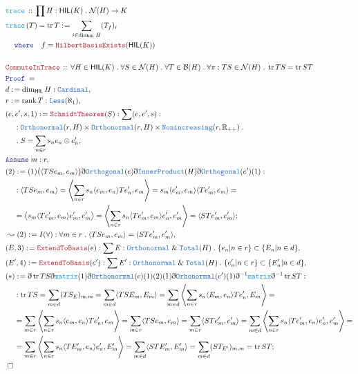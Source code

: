 \documentclass[12pt]{scrartcl}
\newcommand{\TYPE}[1]{\textcolor{NavyBlue}{\mathtt{#1}}}
\newcommand{\FUNC}[1]{\textcolor{Cerulean}{\mathtt{#1}}}
\newcommand{\LOGIC}[1]{\textcolor{Blue}{\mathtt{#1}}}
\newcommand{\THM}[1]{\textcolor{Maroon}{\mathtt{#1}}}
\renewcommand{\.}{\; . \;}
\newcommand{\de}{: \kern 0.1pc =}
\newcommand{\Act}[1]{\left( #1 \right)}
\newcommand{\Theorem}[2]{& \THM{#1} \, :: \, #2 \\ & \Proof = \\ }
\newcommand{\DeclareFunc}[2]{& \FUNC{#1} \, :: \, #2 \\}
\newcommand{\DefineNamedFunc}[4]{&  \FUNC{#1}\Act{#2} = #3 \de #4 \\}
\newcommand{\NewLine}{\\ & \kern 1pc}
\newcommand{\Page}[1]{\begin{align*} #1 \end{align*} \newpage   }
\newcommand{ \bd }{ \ByDef }
\renewcommand{\And}{\; \& \;}
\newcommand{\Reals}{\mathbb{R} }
\newcommand{\Say}[3]{& #1 \de #2 : #3, \\}
\newcommand{\Conclude}[3]{& #1 \de #2 : #3; \\}
\newcommand{\Derive}[3]{& \leadsto #1 \de #2 : #3, \\}
\newcommand{\A}{\LOGIC{Assume} \;}
\newcommand{\Assume}[2]{& \A #1 : #2, \\}
\newcommand{\QED}{\; \square}
\newcommand{\EndProof}{& \QED \\}
\newcommand{\ByDef}{\eth}
\newcommand{\Proof}{\LOGIC{Proof} \; }
\DeclareMathOperator*{\rank}{rank}
\DeclareMathOperator{\tr}{tr}
\newcommand{\HIL}{\mathsf{HIL}} %
\newcommand{\N}{\mathcal{N}}
\newcommand{\B}{\mathcal{B}}
\begin{document}
\Page{
	\DeclareFunc{trace}{  \prod H : \HIL(K) \. \N(H) \to K}
	\DefineNamedFunc{trace}{ T  }{\tr T}{  \sum_{i \in \dim_\HIL H} (T_f)_i
	\NewLine \LOGIC{where} \quad f = \THM{HilbertBasisExists}(\HIL(K))
	} 
	\\
	\Theorem{CommuteInTrace}{ 
	\forall H \in \HIL(K) \. 
	\forall S \in \N(H) \. 
	\forall  T \in \B(H) \.
	\forall \pi : TS \in \N(H) \. \tr TS = \tr ST }
	\Say{d}{\dim_\HIL H}{ \TYPE{Cardinal}}
	\Say{r }{\rank T}{ \TYPE{Less}(\aleph_1 )}
	\Say{(e,e',s,1)}{\THM{SchmidtTheorem}(S)}{ \sum (e,e',s) : 
		\NewLine :
		\TYPE{Orthonormal}(r,H) \times \TYPE{Orthonormal}(r,H)
		\times \TYPE{Nonincreasing}(r,\Reals_{++}) \.
		\NewLine \. S  = \sum_{n \in r} s_n e_n \otimes e'_n 
	}
	\Assume{m}{r}
	\Conclude{(2)}{ (1)\big( \langle TSe_m, e_m \rangle \big) \bd \TYPE{Orthogonal}(e)
		\bd \TYPE{InnerProduct}(H) \bd \TYPE{Orthogonal}(e')(1) 
	}
	{
		\NewLine :
		\langle TSe_m,   e_m \rangle =
		\left\langle \sum_{n \in r} s_n \langle e_ m, e_n \rangle Te'_n, e_m \right\rangle =
		s_m \langle e'_m, e_m \rangle \langle Te'_m,e_m \rangle = \NewLine =
	        \big\langle    s_m \langle Te'_m, e_m  \rangle e'_m  , e'_m   \big \rangle 
		=  \left\langle \sum_{n \in r} s_n\langle Te'_m,e_m \rangle e'_n, e'_m   \right\rangle
		= \langle STe'_m, e'_m \rangle 
	}
	\Derive{(2)}{I(\forall)}{ \forall m \in r \. \langle TSe_m, e_m \rangle = \langle STe'_m,e'_m \rangle }
	\Say{(E,3)}{\THM{ExtendToBasis}(e)}{ \sum E : \TYPE{Orthonormal} \And \TYPE{Total}(H) \. \{ e_n | n \in r\} \subset \{ E_n | n \in d \}}
	\Say{(E',4)}{\THM{ExtendToBasis}(e')}{\sum E' : \TYPE{Orthonormal} \And \TYPE{Total}(H) \.
	 \{ e'_n | n \in r\} \subset \{ E'_n | n \in d\}
	}
	\Conclude{(*)}{\bd \tr TS \bd \FUNC{matrix}(1)\bd \TYPE{Orthonormal}(e)(1)(2)(1)\bd \TYPE{Orhonormal}(e')(1)
		\bd^{-1} \FUNC{matrix} \bd^{-1} \tr ST}
	{
		\NewLine :
		\tr TS = 
		\sum_{m \in d} (TS_{E})_{m,m} =
		\sum_{m \in d} \langle TSE_m ,E_m\rangle =
		\sum_{m \in d} \left \langle \sum_{n \in r} s_n\langle E_m, e_n \rangle Te'_n, E_m \right\rangle = \NewLine = 
		\sum_{m \in r} \left \langle \sum_{n \in r} s_n\langle e_m, e_n \rangle Te'_n, e_m \right\rangle =
		\sum_{m \in r} \langle TSe_m, e_m\rangle =
		\sum_{m \in r} \langle STe'_m,e'_m\rangle =	
		\sum_{m \in d} \left \langle \sum_{n \in r} s_n\langle Te'_m, e_n \rangle e'_n, e'_m \right\rangle = \NewLine =
		\sum_{m \in r} \left \langle \sum_{n \in r} s_n\langle TE'_m, e_n \rangle e'_n, E'_m \right\rangle =
		\sum_{m \in d} \langle STE'_m,E'_m \rangle =
		\sum_{m \in d} (ST_{E'})_{m,m} =
		\tr ST
	}
	\EndProof \\
}
\end{document}
